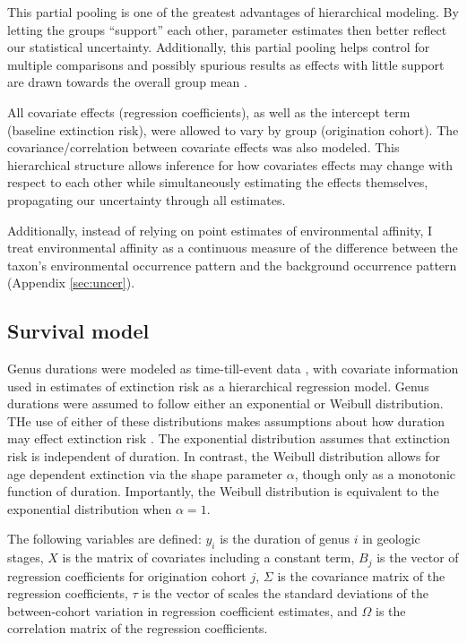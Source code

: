 \documentclass[12pt,letterpaper]{article}
\begin{document}
This partial pooling is one of the greatest advantages of hierarchical modeling. By letting the groups ``support'' each other, parameter estimates then better reflect our statistical uncertainty. Additionally, this partial pooling helps control for multiple comparisons and possibly spurious results as effects with little support are drawn towards the overall group mean \citep{Gelman2013d,Gelman2007}. 

All covariate effects (regression coefficients), as well as the intercept term (baseline extinction risk), were allowed to vary by group (origination cohort). The covariance/correlation between covariate effects was also modeled. This hierarchical structure allows inference for how covariates effects may change with respect to each other while simultaneously estimating the effects themselves, propagating our uncertainty through all estimates. 

Additionally, instead of relying on point estimates of environmental affinity, I treat environmental affinity as a continuous measure of the difference between the taxon's environmental occurrence pattern and the background occurrence pattern (Appendix \ref{sec:uncer}).

\subsection{Survival model}
Genus durations were modeled as time-till-event data \citep{Klein2003}, with covariate information used in estimates of extinction risk as a hierarchical regression model. Genus durations were assumed to follow either an exponential or Weibull distribution. THe use of either of these distributions makes assumptions about how duration may effect extinction risk \citep{Klein2003}. The exponential distribution assumes that extinction risk is independent of duration. In contrast, the Weibull distribution allows for age dependent extinction via the shape parameter \(\alpha\), though only as a monotonic function of duration. Importantly, the Weibull distribution is equivalent to the exponential distribution when \(\alpha = 1\). 

The following variables are defined: \(y_{i}\) is the duration of genus \(i\) in geologic stages, \(X\) is the matrix of covariates including a constant term, \(B_{j}\) is the vector of regression coefficients for origination cohort \(j\), \(\Sigma\) is the covariance matrix of the regression coefficients, \(\tau\) is the vector of scales the standard deviations of the between-cohort variation in regression coefficient estimates, and \(\Omega\) is the correlation matrix of the regression coefficients.
\end{document}
